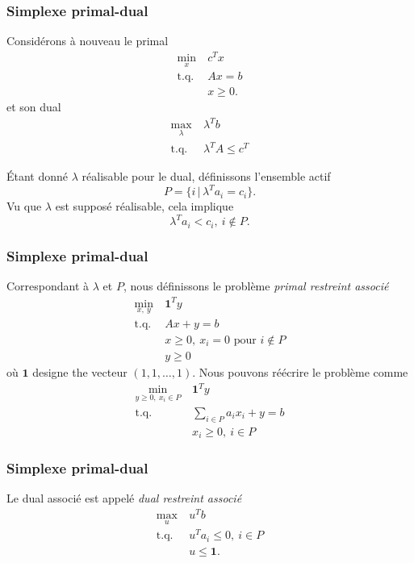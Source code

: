 \documentclass[t,usepdftitle=false]{beamer}
\def\bone{\boldsymbol{1}}
\begin{document}
\begin{frame}
\frametitle{Simplexe primal-dual}

Considérons à nouveau le primal
\begin{align*}
\min_x \ & c^Tx \\
\mbox{t.q. } & Ax = b\\
& x \geq 0.
\end{align*}
et son dual
\begin{align*}
\max_{\lambda} \ & \lambda^T b \\
\mbox{t.q. } & \lambda^T A \leq c^T
\end{align*}

\mbox{}

Étant donné $\lambda$ réalisable pour le dual, définissons l'ensemble actif
\[
P = \lbrace i \,|\, \lambda^T a_i = c_i \rbrace.
\]
Vu que $\lambda$ est supposé réalisable, cela implique
\[
\lambda^T a_i < c_i,\ i \notin P.
\]

\end{frame}

\begin{frame}
\frametitle{Simplexe primal-dual}

Correspondant à $\lambda$ et $P$, nous définissons le problème {\sl primal restreint associé}
\begin{align*}
\min_{x,\ y} \ & \bone^Ty \\
\mbox{t.q. } & Ax + y = b\\
& x \geq 0,\ x_i = 0 \mbox{ pour } i \notin P\\
& y \geq 0
\end{align*}
où $\bone$ designe the vecteur $(1, 1, \ldots, 1)$.
Nous pouvons réécrire le problème comme
\begin{align*}
\min_{y \geq 0,\ x_i \in P} \ & \bone^Ty \\
\mbox{t.q. } & \sum_{i \in P} a_ix_i + y = b\\
& x_i \geq 0,\  i \in P
\end{align*}

\end{frame}

\begin{frame}
\frametitle{Simplexe primal-dual}

Le dual associé est appelé {\sl dual restreint associé}
\begin{align*}
\max_u\ & u^T b\\
\mbox{t.q. } & u^T a_i \leq 0,\ i \in P\\
& u \leq \bone.
\end{align*}

\end{frame}
\end{document}
